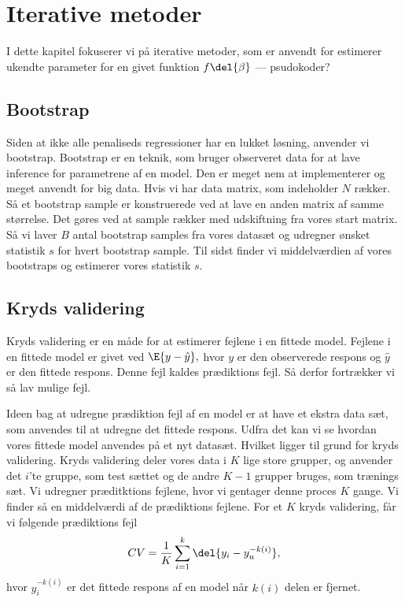 \chapter{Iterative metoder}
I dette kapitel fokuserer vi på iterative metoder, som er anvendt for estimerer ukendte parameter for en givet funktion $f \del{\beta}$
--- psudokoder? 

\section{Bootstrap}
Siden at ikke alle penaliseds regressioner har en lukket løsning, anvender vi bootstrap. 
Bootstrap er en teknik, som bruger observeret data for at lave inference for parametrene af en model. Den er meget nem at implementerer og meget anvendt for big data. 
Hvis vi har data matrix, som indeholder $N$ rækker. Så et bootstrap sample er konstruerede ved at lave en anden matrix af samme størrelse. Det gøres ved at sample rækker med udskiftning fra vores start matrix. 
Så vi laver $B$ antal bootstrap samples fra vores datasæt og udregner ønsket statistik $s$ for hvert bootstrap sample. Til sidst finder vi middelværdien af vores bootstraps og estimerer vores statistik $s$.

\section{Kryds validering}
Kryds validering er en måde for at estimerer fejlene i en fittede model. Fejlene i en fittede model er givet ved $\E{y - \hat{y}},$ hvor $y$ er den observerede respons og  $\hat{y} $ er den fittede respons. Denne fejl kaldes prædiktions fejl. Så derfor fortrækker vi så lav mulige fejl. 

Ideen bag at udregne prædiktion fejl af en model er at have et ekstra data sæt, som anvendes til at udregne det fittede respons. Udfra det kan vi se hvordan vores fittede model anvendes på et nyt datasæt. %
Hvilket ligger til grund for kryds validering. Kryds validering deler vores data i $K$ lige store  grupper, og anvender det $i$'te gruppe, som test sættet og de andre $K-1$ grupper bruges, som trænings sæt. Vi udregner præditktions fejlene, hvor vi gentager denne proces $K$ gange. Vi finder så en middelværdi af de prædiktions fejlene. 
For et $K$ kryds validering, får vi følgende prædiktions fejl
\begin{align*}
CV = \frac{1}{K} \sum_{i =1}^k \del{y_i - y_u^{-k(i)}},
\end{align*}
hvor $y_i^{-k(i)}$ er det fittede respons af en model når $k(i)$ delen er fjernet. 